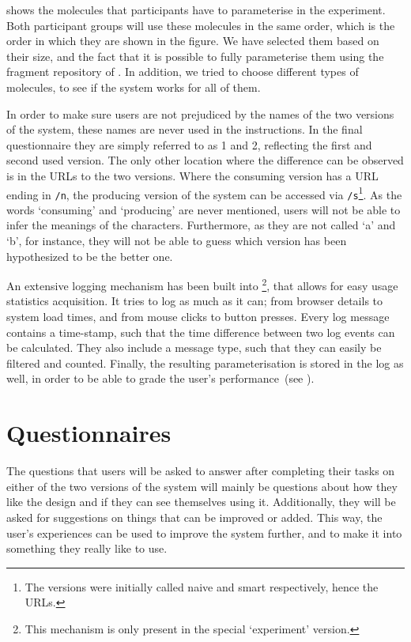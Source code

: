  shows the molecules that participants have to parameterise in the experiment. Both participant groups will use these molecules in the same order, which is the order in which they are shown in the figure. We have selected them based on their size, and the fact that it is possible to fully parameterise them using the fragment repository of \oframp. In addition, we tried to choose different types of molecules, to see if the system works for all of them.

In order to make sure users are not prejudiced by the names of the two versions of the system, these names are never used in the instructions. In the final questionnaire they are simply referred to as 1 and 2, reflecting the first and second used version. The only other location where the difference can be observed is in the URLs to the two versions. Where the consuming version has a URL ending in \verb|/n|, the producing version of the system can be accessed via \verb|/s|\footnote{The versions were initially called naive and smart respectively, hence the URLs.}. As the words `consuming' and `producing' are never mentioned, users will not be able to infer the meanings of the characters. Furthermore, as they are not called `a' and `b', for instance, they will not be able to guess which version has been hypothesized to be the better one.

An extensive logging mechanism has been built into \oframp\footnote{This mechanism is only present in the special `experiment' version.}, that allows for easy usage statistics acquisition. It tries to log as much as it can; from browser details to system load times, and from mouse clicks to button presses. Every log message contains a time-stamp, such that the time difference between two log events can be calculated. They also include a message type, such that they can easily be filtered and counted. Finally, the resulting parameterisation is stored in the log as well, in order to be able to grade the user's performance~(see ).



\section{Questionnaires}
The questions that users will be asked to answer after completing their tasks on either of the two versions of the system will mainly be questions about how they like the design and if they can see themselves using it. Additionally, they will be asked for suggestions on things that can be improved or added. This way, the user's experiences can be used to improve the system further, and to make it into something they really like to use.

